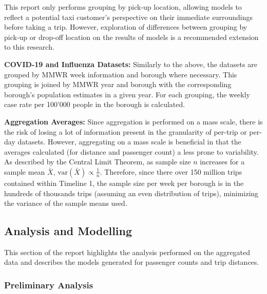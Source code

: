 \documentclass[11pt]{article}
\begin{document}
This report only performs grouping by pick-up location,
allowing models to reflect a potential taxi customer's perspective on their immediate surroundings before taking a trip.
However, exploration of differences between grouping by pick-up or drop-off location on the results of models 
is a recommended extension to this research.

\textbf{COVID-19 and Influenza Datasets:}
Similarly to the above, the datasets are grouped by MMWR week information and borough where necessary.
This grouping is joined by MMWR year and borough with the corresponding borough's population estimates in a given year.
For each grouping, the weekly case rate per 100'000 people in the borough is calculated.

\textbf{Aggregation Averages:}
Since aggregation is performed on a mass scale, there is the risk of losing a lot of information present in the granularity of per-trip or per-day datasets.
However, aggregating on a mass scale is beneficial in that the averages calculated (for distance and passenger count)
a less prone to variability. As described by the Central Limit Theorem, as sample size $n$ increases for a sample mean $\bar{X}$, 
$\text{var}(\bar{X}) \propto \frac{1}{n}$. Therefore, since there over 150 million trips contained within Timeline 1, the sample size per week per borough is in the hundreds of thousands trips (assuming an even distribution of trips),
minimizing the variance of the sample means used.

\pagebreak
\subsection{Analysis and Modelling}

This section of the report highlights the analysis performed on the aggregated data
and describes the models generated for passenger counts and trip distances.

\subsubsection{Preliminary Analysis}
\end{document}

